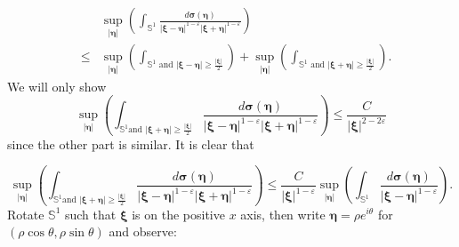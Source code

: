 \documentclass[reqno]{amsart}
\theoremstyle{plain}
\numberwithin{equation}{section}
\begin{document}
\begin{eqnarray*}
&&\sup_{\left\vert \mathbf{\eta }\right\vert }\left( \int_{\mathbb{S}^{1}}\frac{d\mathbf{\sigma (\eta )}}{\left\vert \mathbf{\xi }-\mathbf{\eta }\right\vert ^{1-\varepsilon }\left\vert \mathbf{\xi }+\mathbf{\eta }\right\vert ^{1-\varepsilon }}\right) \\
&\leqslant &\sup_{\left\vert \mathbf{\eta }\right\vert }\left( \int_{\mathbb{S}^{1}\text{ and }\left\vert \mathbf{\xi }-\mathbf{\eta }\right\vert
\geqslant \frac{\left\vert \mathbf{\xi }\right\vert }{2}}\right)
+\sup_{\left\vert \mathbf{\eta }\right\vert }\left( \int_{\mathbb{S}^{1}\text{ and }\left\vert \mathbf{\xi }+\mathbf{\eta }\right\vert \geqslant 
\frac{\left\vert \mathbf{\xi }\right\vert }{2}}\right) .
\end{eqnarray*}We will only show\begin{equation*}
\sup_{\left\vert \mathbf{\eta }\right\vert }\left( \int_{\mathbb{S}^{1}\text{
and }\left\vert \mathbf{\xi }+\mathbf{\eta }\right\vert \geqslant \frac{\left\vert \mathbf{\xi }\right\vert }{2}}\frac{d\mathbf{\sigma (\eta )}}{\left\vert \mathbf{\xi }-\mathbf{\eta }\right\vert ^{1-\varepsilon
}\left\vert \mathbf{\xi }+\mathbf{\eta }\right\vert ^{1-\varepsilon }}\right) \leqslant \frac{C}{\left\vert \mathbf{\xi }\right\vert
^{2-2\varepsilon }}
\end{equation*}since the other part is similar. It is clear that

\begin{equation}
\sup_{\left\vert \mathbf{\eta }\right\vert }\left( \int_{\mathbb{S}^{1}\text{
and }\left\vert \mathbf{\xi }+\mathbf{\eta }\right\vert \geqslant \frac{\left\vert \mathbf{\xi }\right\vert }{2}}\frac{d\mathbf{\sigma (\eta )}}{\left\vert \mathbf{\xi }-\mathbf{\eta }\right\vert ^{1-\varepsilon
}\left\vert \mathbf{\xi }+\mathbf{\eta }\right\vert ^{1-\varepsilon }}\right) \leqslant \frac{C}{\left\vert \mathbf{\xi }\right\vert
^{1-\varepsilon }}\sup_{\left\vert \mathbf{\eta }\right\vert }\left( \int_{\mathbb{S}^{1}}\frac{d\mathbf{\sigma (\eta )}}{\left\vert \mathbf{\xi }-\mathbf{\eta }\right\vert ^{1-\varepsilon }}\right) .
\label{estimate:3*2d middle 1}
\end{equation}Rotate $\mathbb{S}^{1}$ such that $\mathbf{\xi }$ is on the positive $x$
axis, then write $\mathbf{\eta }=\rho e^{i\theta }$ for $(\rho \cos \theta
,\rho \sin \theta )$ and observe:
\end{document}
